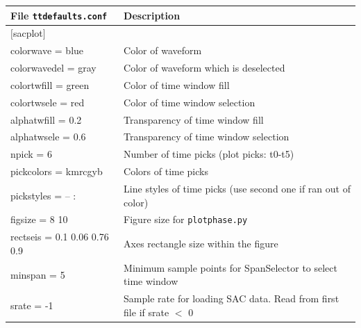 \documentclass[12pt, titlepage]{article}
\begin{document}
\begin{table}[h!]
\centering
{\scriptsize
\begin{tabular}{l l}
\toprule
File \texttt{ttdefaults.conf} 	& Description \\
\midrule
$[$sacplot$]$ 			& \\
colorwave = blue		& Color of waveform \\
colorwavedel = gray		& Color of waveform which is deselected \\
colortwfill = green		& Color of time window fill \\
colortwsele = red		& Color of time window selection \\
alphatwfill = 0.2			& Transparency of time window fill \\
alphatwsele = 0.6		& Transparency of time window selection \\
npick = 6				& Number of time picks (plot picks: t0-t5) \\
pickcolors = kmrcgyb	& Colors of time picks \\
pickstyles = -- :			& Line styles of time picks (use second one if ran out of color)\\
figsize = 8 10			& Figure size for \texttt{plotphase.py} \\
rectseis = 0.1 0.06 0.76 0.9 & Axes rectangle size within the figure \\
minspan = 5 			& Minimum sample points for SpanSelector to select time window \\
srate = -1 				& Sample rate for loading SAC data. Read from first file if srate $<$ 0 \\


\end{tabular}}
\end{table}
\end{document}
